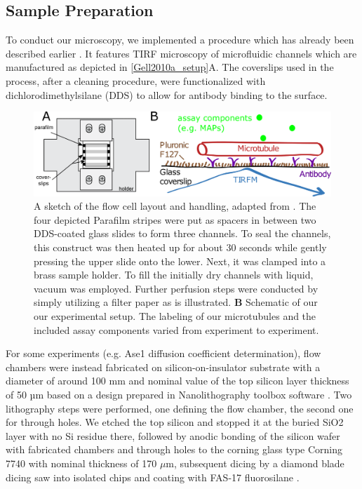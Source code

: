 \subsection{Sample Preparation}
\label{assayPREP}
To conduct our microscopy, we implemented a procedure which has already been described earlier \parencite{Gell2010a}. It features TIRF microscopy of microfluidic channels which are manufactured as depicted in \autoref{Gell2010a_setup}A. The coverslips used in the process, after a cleaning procedure, were functionalized with dichlorodimethylsilane (DDS) to allow for antibody binding to the surface.\par
\begin{figure}[htb]
\centering
\includegraphics[scale=1.1]{Figures/setup.png}
\caption[The flow cell layout and handling, adapted from \parencite{Gell2010a}]{
		A sketch of the flow cell layout and handling, adapted from \parencite{Gell2010a}. The four depicted Parafilm stripes were put as spacers in between two DDS-coated glass slides to form three channels. To seal the channels, this construct was then heated up for about 30 seconds while gently pressing the upper slide onto the lower. Next, it was clamped into a brass sample holder. To fill the initially dry channels with liquid, vacuum was employed. Further perfusion steps were conducted by simply utilizing a filter paper as is illustrated. \textbf{B} Schematic of our our experimental setup. The labeling of our microtubules and the included assay components varied from experiment to experiment. 
	}\label{Gell2010a_setup}
\end{figure}
For some experiments (e.g. Ase1 diffusion coefficient determination), flow chambers were instead fabricated on silicon-on-insulator substrate with a diameter of around 100 mm and nominal value of the top silicon layer thickness of 50 µm based on a design prepared in Nanolithography toolbox software \parencite{Zhang2020}. Two lithography steps were performed, one defining the flow chamber, the second one for through holes. We etched the top silicon and stopped it at the buried SiO2 layer with no Si residue there, followed by anodic bonding of the silicon wafer with fabricated chambers and through holes to the corning glass type Corning 7740 with nominal thickness of 170 $\mu$m, subsequent dicing by a diamond blade dicing saw into isolated chips and coating with FAS-17 fluorosilane \parencite{Castro2018}. \par
